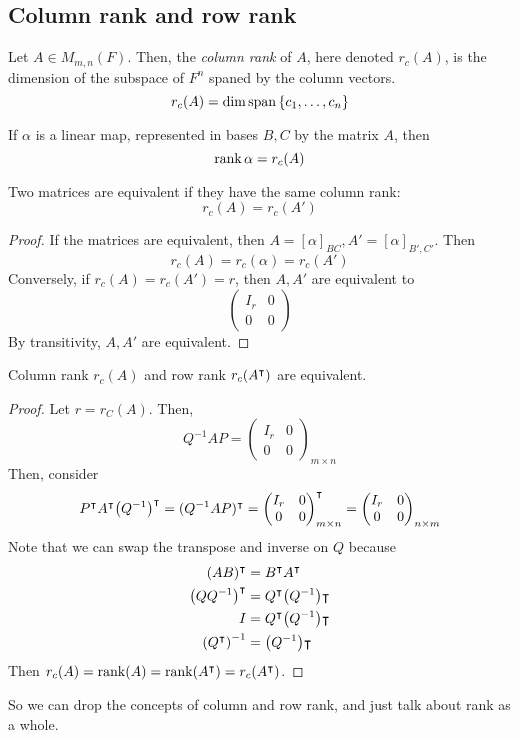\subsection{Column rank and row rank}
\begin{definition}
	Let \( A \in M_{m,n}(F) \).
	Then, the \textit{column rank} of \( A \), here denoted \( r_c(A) \), is the dimension of the subspace of \( F^n \) spaned by the column vectors.
	\[
		r_c(A) = \dim \operatorname{span} \qty{c_1, \dots, c_n}
	\]
\end{definition}
\begin{remark}
	If \( \alpha \) is a linear map, represented in bases \( B, C \) by the matrix \( A \), then
	\[
		\rank \alpha = r_c(A)
	\]
\end{remark}
\begin{proposition}
	Two matrices are equivalent if they have the same column rank:
	\[
		r_c(A) = r_c(A')
	\]
\end{proposition}
\begin{proof}
	If the matrices are equivalent, then \( A = [\alpha]_{BC}, A' = [\alpha]_{B',C'} \).
	Then
	\[
		r_c(A) = r_c(\alpha) = r_c(A')
	\]
	Conversely, if \( r_c(A) = r_c(A') = r \), then \( A, A' \) are equivalent to
	\[
		\begin{pmatrix}
			I_r & 0 \\
			0   & 0
		\end{pmatrix}
	\]
	By transitivity, \( A, A' \) are equivalent.
\end{proof}
\begin{theorem}
	Column rank \( r_c(A) \) and row rank \( r_c(A^\intercal) \) are equivalent.
\end{theorem}
\begin{proof}
	Let \( r = r_C(A) \).
	Then,
	\[
		Q^{-1}AP = \begin{pmatrix}
			I_r & 0 \\
			0   & 0
		\end{pmatrix}_{m \times n}
	\]
	Then, consider
	\[
		P^\intercal A^\intercal \qty(Q^{-1})^\intercal = (Q^{-1}AP)^\intercal = \begin{pmatrix}
			I_r & 0 \\
			0   & 0
		\end{pmatrix}_{m \times n}^\intercal = \begin{pmatrix}
			I_r & 0 \\
			0   & 0
		\end{pmatrix}_{n \times m}
	\]
	Note that we can swap the transpose and inverse on \( Q \) because
	\begin{align*}
		(AB)^\intercal          & = B^\intercal A^\intercal           \\
		\qty(QQ^{-1})^\intercal & = Q^\intercal \qty(Q^{-1})\intercal \\
		I                        & = Q^\intercal \qty(Q^{-1})\intercal \\
		\qty(Q^\intercal)^{-1}  & = \qty(Q^{-1})\intercal
	\end{align*}
	Then \( r_c(A) = \rank(A) = \rank(A^\intercal) = r_c(A^\intercal) \).
\end{proof}
So we can drop the concepts of column and row rank, and just talk about rank as a whole.

